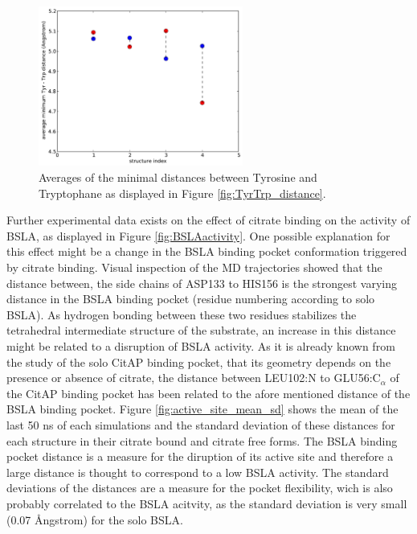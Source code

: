 \documentclass[english, a4paper, 12pt, titlepage, draft]{article}
\begin{document}
\begin{figure}
    \centering
    \includegraphics[width=0.6\textwidth]{figures/TyrTrp/average_mindist_TyrTrp.pdf}
    \caption{Averages of the minimal distances between Tyrosine and Tryptophane as displayed in Figure \ref{fig:TyrTrp_distance}.}
    \label{fig:TyrTrp_average}
\end{figure}         



          


Further experimental data exists on the effect of citrate binding on the activity of BSLA, as displayed in Figure \ref{fig:BSLAactivity}.
One possible explanation for this effect might be a change in the BSLA binding pocket conformation triggered by citrate binding.
Visual inspection of the MD trajectories showed that the distance between, the side chains of ASP133 to HIS156 is the strongest varying distance in the BSLA binding pocket (residue numbering according to solo BSLA).
As hydrogen bonding between these two residues stabilizes the tetrahedral intermediate structure of the substrate, an increase in this distance might be related to a disruption of BSLA activity.
As it is already known from the study of the solo CitAP binding pocket, that its geometry depends on the presence or absence of citrate, the distance between LEU102:N to GLU56:C$_{\alpha}$ of the CitAP binding pocket has been related to the afore mentioned distance of the BSLA binding pocket.
Figure \ref{fig:active_site_mean_sd} shows the mean of the last 50 ns of each simulations and the standard deviation of these distances for each structure in their citrate bound and citrate free forms.
The BSLA binding pocket distance is a measure for the diruption of its active site and therefore a large distance is thought to correspond to a low BSLA activity.
The standard deviations of the distances are a measure for the pocket flexibility, wich is also probably correlated to the BSLA acitvity, as the standard deviation is very small (0.07 \r{A}ngstrom) for the solo BSLA.
\end{document}
